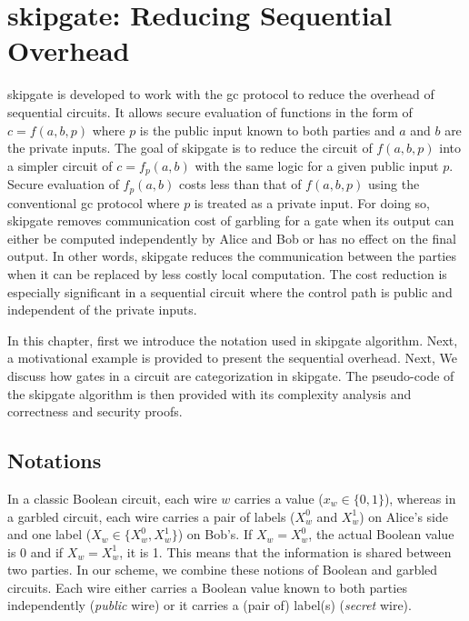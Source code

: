 \chapter{{\gls{skipgate}}: Reducing Sequential Overhead}\label{chap:skipgate}
\gls{skipgate} is developed to work with the \acrshort{gc} protocol to reduce the overhead of sequential circuits.
It allows secure evaluation of functions in the form of $c = f(a, b, p)$ where $p$ is the public input known to both parties and $a$ and $b$ are the private inputs.
The goal of \gls{skipgate} is to reduce the circuit of $f(a, b, p)$ into a simpler circuit of $c = f_p(a,b)$ with the same logic for a given public input $p$.
Secure evaluation of $f_p(a,b)$ costs less than that of $f(a, b, p)$ using the conventional \acrshort{gc} protocol where $p$ is treated as a private input.
For doing so, \gls{skipgate} removes communication cost of garbling for a gate when its output can either be computed independently by Alice and Bob or has no effect on the final output.
In other words, \gls{skipgate} reduces the communication between the parties when it can be replaced by less costly local computation.
The cost reduction is especially significant in a sequential circuit where the control path is public and independent of the private inputs.

In this chapter, first we introduce the notation used in \gls{skipgate} algorithm.
Next, a motivational example is provided to present the sequential overhead.
Next, We discuss how gates in a circuit are categorization in \gls{skipgate}.
The pseudo-code of the \gls{skipgate} algorithm is then provided with its complexity analysis and correctness and security proofs.

\section{Notations}\label{sec:skipgate-notation}
In a classic Boolean circuit, each wire $w$ carries a value ($x_w\in\{0, 1\}$), whereas in a garbled circuit, each wire carries a pair of labels ($X_w^{0}$ and $X_w^{1}$) on Alice's side and one label ($X_w \in \{X_w^{0}, X_w^{1}\}$) on Bob's.
If $X_w = X_w^{0}$, the actual Boolean value is 0 and if $X_w = X_w^{1}$, it is 1.
This means that the information is shared between two parties.
In our scheme, we combine these notions of Boolean and garbled circuits.
Each wire either carries a Boolean value known to both parties independently (\textit{public} wire) or it carries a (pair of) label(s) (\textit{secret} wire).

